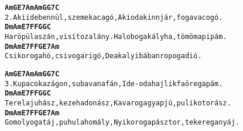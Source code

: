 \begin{minipage}{\textwidth}
\kottastart
{}
\kottaend
\begin{minipage}{\textwidth}
\begin{alltt}
\textbf{   Am      G         E7       Am   Am      G         G7       C}
2. Aki idebenn ül, szeme kacagó,   Aki odakinn jár, foga vacogó.
\textbf{   Dm         Am     E7        F    F           G       G         C}
   Ha röpül a szán, visítoz a lány. Ha lobog a kályha, tömöm a pipám.
\textbf{   Dm          Am   E7        F   F         G       E7     Am}
   Csikorog a hó, csivog a rigó, De a kalyibában ropog a dió.
\end{alltt}
\vspace{0.0cm}
\versszakspacing
\end{minipage}
\begin{minipage}{\textwidth}
\begin{alltt}
\textbf{   Am         G      E7         Am  Am       G      G7      C}
3. Kupacok az ágon, suba van a fán, Ide-oda hajlik fa öregapám.
\textbf{   Dm         Am    E7       F     F          G      G        C}
   Terel a juhász, keze hadonász, Kavarog a gyapjú, puli kotorász.
\textbf{   Dm          Am   E7        F      F         G        E7         Am}
   Gomolyog a táj, puhul a homály, Nyikorog a pásztor, tekereg a nyáj.
\end{alltt}
\vspace{0.0cm}
\versszakspacing
\end{minipage}
\end{minipage}
~\vspace{1.0cm}
\newline
